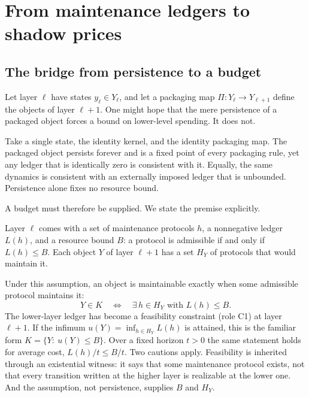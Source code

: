 \section{From maintenance ledgers to shadow prices}\label{sec:duality}

\subsection{The bridge from persistence to a budget}\label{sec:bridge}

Let layer \(\ell\) have states \(y_\ell\in Y_\ell\), and let a packaging map \(\Pi:Y_\ell\to Y_{\ell+1}\) define the objects of layer \(\ell+1\). One might hope that the mere persistence of a packaged object forces a bound on lower-level spending. It does not.

\begin{example}\label{ex:identity}
Take a single state, the identity kernel, and the identity packaging map. The packaged object persists forever and is a fixed point of every packaging rule, yet any ledger that is identically zero is consistent with it. Equally, the same dynamics is consistent with an externally imposed ledger that is unbounded. Persistence alone fixes no resource bound.
\end{example}

A budget must therefore be supplied. We state the premise explicitly.

\begin{assumption}\label{ass:ledger}
Layer \(\ell\) comes with a set of maintenance protocols \(h\), a nonnegative ledger \(L(h)\), and a resource bound \(B\): a protocol is admissible if and only if \(L(h)\le B\). Each object \(Y\) of layer \(\ell+1\) has a set \(H_Y\) of protocols that would maintain it.
\end{assumption}

Under this assumption, an object is maintainable exactly when some admissible protocol maintains it:
\[
Y\in K\quad\Longleftrightarrow\quad \exists\, h\in H_Y \text{ with } L(h)\le B .
\]
The lower-layer ledger has become a feasibility constraint (role C1) at layer \(\ell+1\). If the infimum \(u(Y)=\inf_{h\in H_Y}L(h)\) is attained, this is the familiar form \(K=\{Y:\ u(Y)\le B\}\). Over a fixed horizon \(t>0\) the same statement holds for average cost, \(L(h)/t\le B/t\). Two cautions apply. Feasibility is inherited through an existential witness: it says that some maintenance protocol exists, not that every transition written at the higher layer is realizable at the lower one. And the assumption, not persistence, supplies \(B\) and \(H_Y\).


